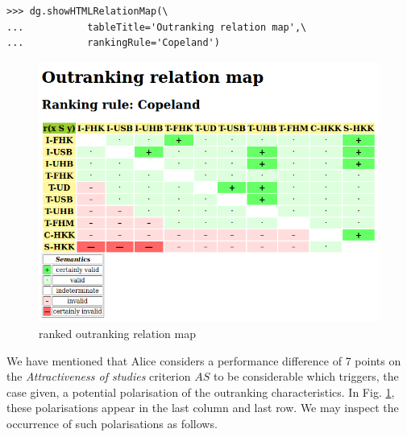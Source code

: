\begin{lstlisting}
>>> dg.showHTMLRelationMap(\
...           tableTitle='Outranking relation map',\
...           rankingRule='Copeland')
\end{lstlisting}
\begin{figure}[h]
\sidecaption
\includegraphics[width=12cm]{Figures/aliceRelationmap.png}
\caption{\Copeland ranked outranking relation map}
\label{fig:12.4}       %
\end{figure}

We have mentioned that Alice considers a performance difference of 7 points on the \emph{Attractiveness of studies} criterion $AS$ to be considerable which triggers, the case given, a potential polarisation of the outranking characteristics. In Fig. \ref{fig:12.4}, these polarisations appear in the last column and last row. We may inspect the occurrence of such polarisations as follows.

